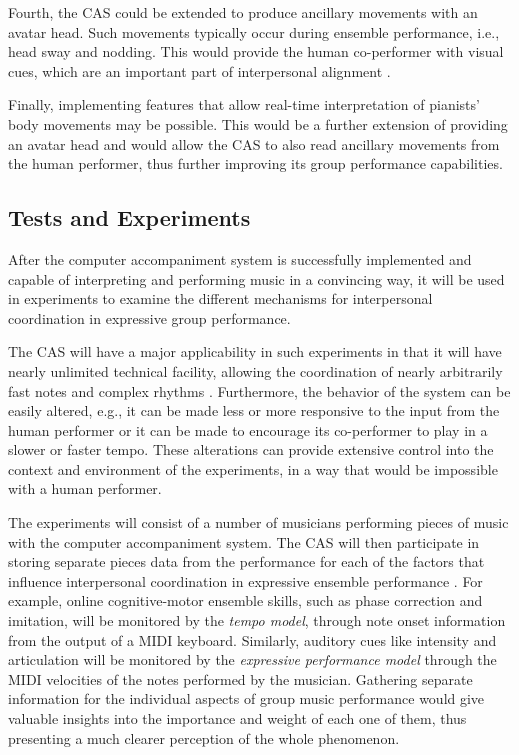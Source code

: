 \documentclass[12pt]{scrartcl}
\begin{document}
Fourth, the CAS could be extended to produce ancillary movements with an avatar head. Such movements typically occur during ensemble performance, i.e., head sway and nodding. This would provide the human co-performer with visual cues, which are an important part of interpersonal alignment \citep{keller-stuff}.

Finally, implementing features that allow real-time interpretation of pianists' body movements may be possible. This would be a further extension of providing an avatar head and would allow the CAS to also read ancillary movements from the human performer, thus further improving its group performance capabilities. 

\subsection{Tests and Experiments}
\label{test-experiments}
After the computer accompaniment system is successfully implemented and capable of interpreting and performing music in a convincing way, it will be used in experiments to examine the different mechanisms for interpersonal coordination in expressive group performance.

The CAS will have a major applicability in such experiments in that it will have nearly unlimited technical facility, allowing the coordination of nearly arbitrarily fast notes and complex rhythms \citep{music-score-alignment}. Furthermore, the behavior of the system can be easily altered, e.g., it can be made less or more responsive to the input from the human performer or it can be made to encourage its co-performer to play in a slower or faster tempo. These alterations can provide extensive control into the context and environment of the experiments, in a way that would be impossible with a human performer.

The experiments will consist of a number of musicians performing pieces of music with the computer accompaniment system. The CAS will then participate in storing separate pieces data from the performance for each of the factors that influence interpersonal coordination in expressive ensemble performance \citep{keller-stuff}. For example, online cognitive-motor ensemble skills, such as phase correction and imitation, will be monitored by the \textit{tempo model}, through note onset information from the output of a MIDI keyboard. Similarly, auditory cues like intensity and articulation will be monitored by the \textit{expressive performance model} through the MIDI velocities of the notes performed by the musician. Gathering separate information for the individual aspects of group music performance would give valuable insights into the importance and weight of each one of them, thus presenting a much clearer perception of the whole phenomenon.
\end{document}
